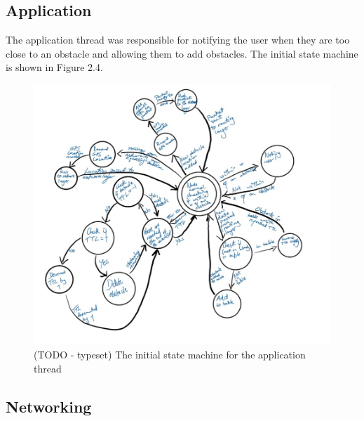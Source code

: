\documentclass[12pt,a4paper]{report}
\begin{document}
\subsection{Application}
The application thread was responsible for notifying the user when they are too close to an obstacle and allowing them to add obstacles. The initial state machine is shown in Figure 2.4. %
\begin{figure}[h]
\begin{center}
\includegraphics[scale=0.5]{appThread.jpg}
\end{center}
\caption{(TODO - typeset) The initial state machine for the application thread}
\end{figure}
\FloatBarrier

\subsection{Networking}
\end{document}
